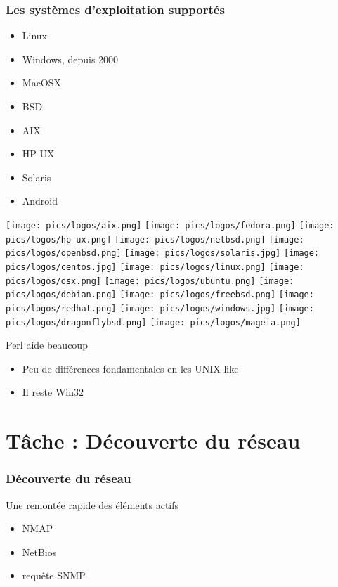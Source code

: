 \documentclass{beamer}
\begin{document}
\begin{frame}
    \frametitle{Les systèmes d'exploitation supportés}

    \begin{itemize}
        \item Linux
        \item Windows, depuis 2000
        \item MacOSX 
        \item BSD
        \item AIX
        \item HP-UX
        \item Solaris
        \item Android
    \end{itemize}


\texttt{[image: pics/logos/aix.png]}
\texttt{[image: pics/logos/fedora.png]}
\texttt{[image: pics/logos/hp-ux.png]}
\texttt{[image: pics/logos/netbsd.png]}
\texttt{[image: pics/logos/openbsd.png]}
\texttt{[image: pics/logos/solaris.jpg]}
\texttt{[image: pics/logos/centos.jpg]}
\texttt{[image: pics/logos/linux.png]}
\texttt{[image: pics/logos/osx.png]}
\texttt{[image: pics/logos/ubuntu.png]}
\texttt{[image: pics/logos/debian.png]}
\texttt{[image: pics/logos/freebsd.png]}
\texttt{[image: pics/logos/redhat.png]}
\texttt{[image: pics/logos/windows.jpg]}
\texttt{[image: pics/logos/dragonflybsd.png]}
\texttt{[image: pics/logos/mageia.png]}

\end{frame}

\begin{frame}    
    \begin{block}{Perl aide beaucoup}
        \begin{itemize}
            \item Peu de différences fondamentales en les UNIX like
            \item Il reste Win32
        \end{itemize}
    \end{block}
\end{frame}

\section{Tâche : Découverte du réseau}

\begin{frame}
    \frametitle{Découverte du réseau}

    \begin{block}{Une remontée rapide des éléments actifs}
    \begin{itemize}
      \item NMAP 
      \item NetBios
      \item requête SNMP
    \end{itemize}
    \end{block}

\end{frame}
\end{document}

